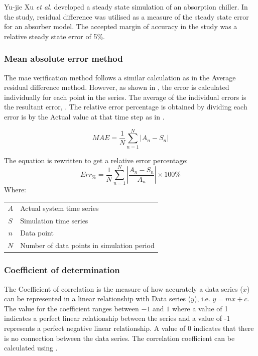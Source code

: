  			Yu-jie Xu \textit{et al.} \cite{xu2016modeling} developed a steady state simulation of an absorption chiller. In the study, residual difference was utilised as a measure of the steady state error for an absorber model. The accepted margin of accuracy in the study was a relative steady state error of 5\%. 
 			
 		\subsubsection{Mean absolute error method}
 		The \gls{mae} verification method follows a similar calculation as in the Average residual difference method. However, as shown in , the error is calculated individually for each point in the series. The average of the individual errors is the resultant error, . The relative error percentage is obtained by dividing each error is by the Actual value at that time step as in .
 		\par
 		\begin{equation}
 		\label{eq: Relative error 2}
 		MAE = \dfrac{1}{N}\sum_{n=1}^{N}{\left|A_{n} - S_{n}\right| }
 		\end{equation}
 		
 			The equation is rewritten to get a relative error percentage:	
 			\begin{equation}
 			\label{eq: Relative error}
 			Err_{\%} = \dfrac{1}{N}\sum_{n=1}^{N}{\left|\dfrac{A_{n} - S_{n}}{A_{n}}\right| }\times 100 \%
 			\end{equation}
 			Where: \par
 			\begin{table}[h!]
 				\centering
 				\begin{tabular}{cl}
 					$A$ & Actual system time series \\
 					$S$ & Simulation time series \\
 					$n$ & Data point \\
 					$N$ & Number of data points in simulation period \\
 				\end{tabular} 
 			\end{table} 
 		\subsubsection{Coefficient of determination}
 		The Coefficient of correlation is the measure of how accurately a data series ($ x $) can be represented in a linear relationship with Data series ($ y $), i.e. $ y = mx+c$. The value for the coefficient ranges between $ -1 $ and $ 1 $ where a value of 1 indicates a perfect linear relationship between the series and a value of -1 represents a perfect negative linear relationship. A value of 0 indicates that there is no connection between the data series. The correlation coefficient can be calculated using  \cite{sarin2010comparing}.
 		
